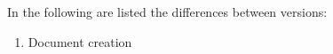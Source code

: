 In the following are listed the differences between versions:
\begin{enumerate}
	\item Document creation
\end{enumerate}